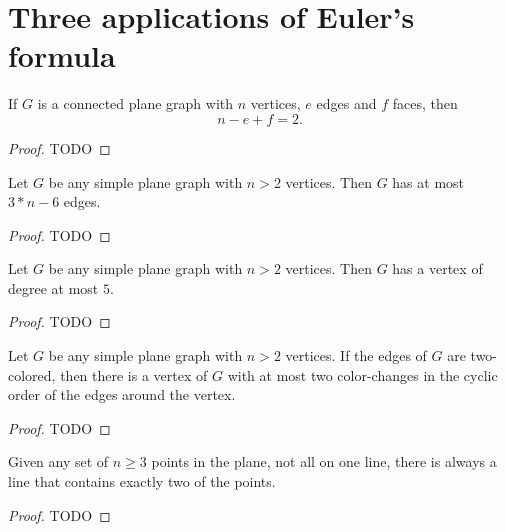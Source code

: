 \chapter{Three applications of Euler's formula}

\begin{theorem}
  \label{euler_formula}
  If \(G\) is a connected plane graph with \(n\) vertices, \(e\) edges and \(f\) faces, then
  \[
  n - e + f = 2.
  \]
\end{theorem}
\begin{proof}
  TODO
\end{proof}


\begin{proposition}
  \label{euler_consequence_a}
  Let \(G\) be any simple plane graph with \(n>2\) vertices.
  Then \(G\) has at most \(3*n - 6\) edges.
\end{proposition}
\begin{proof}
  TODO
\end{proof}

\begin{proposition}
  \label{euler_consequence_b}
  Let \(G\) be any simple plane graph with \(n>2\) vertices.
  Then \(G\) has a vertex of degree at most \(5\).
\end{proposition}
\begin{proof}
  TODO
\end{proof}

\begin{proposition}
  \label{euler_consequence_c}
  Let \(G\) be any simple plane graph with \(n>2\) vertices.
  If the edges of \(G\) are two-colored, then there is a vertex of \(G\) with at most two
  color-changes in the cyclic order of the edges around the vertex.
\end{proposition}
\begin{proof}
  TODO
\end{proof}

\begin{theorem}
  \label{sylvester_gallai2}
  Given any set of \(n \ge 3\) points in the
  plane, not all on one line, there is always a line that contains exactly two
  of the points.
\end{theorem}
\begin{proof}
  TODO
\end{proof}

